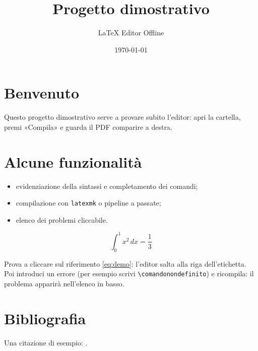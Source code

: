 \documentclass[11pt,a4paper]{article}
\title{Progetto dimostrativo}
\author{LaTeX Editor Offline}
\date{\today}
\begin{document}
\maketitle

\section{Benvenuto}
Questo progetto dimostrativo serve a provare subito l'editor: apri la
cartella, premi «Compila» e guarda il PDF comparire a destra.

\section{Alcune funzionalità}
\begin{itemize}
  \item evidenziazione della sintassi e completamento dei comandi;
  \item compilazione con \texttt{latexmk} o pipeline a passate;
  \item elenco dei problemi cliccabile.
\end{itemize}

\begin{equation}
  \label{eq:demo}
  \int_0^1 x^2 \, dx = \frac{1}{3}
\end{equation}

Prova a cliccare sul riferimento \eqref{eq:demo}: l'editor salta alla
riga dell'etichetta. Poi introduci un errore (per esempio scrivi
\verb|\comandonondefinito|) e ricompila: il problema apparirà nell'elenco
in basso.

\section{Bibliografia}
Una citazione di esempio: \cite{esempio2024}.



\end{document}
